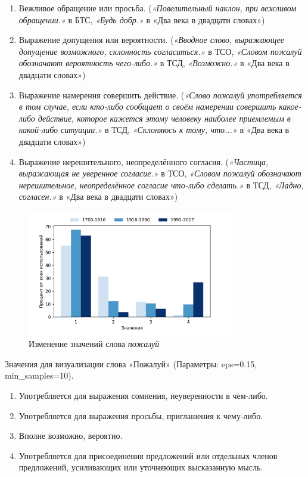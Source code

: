 \begin{enumerate}
    \item Вежливое обращение или просьба.
(\textit{«Повелительный наклон, при вежливом обращении.»} в БТС,
\textit{«Будь добр.»} в «Два века в двадцати словах»)
    \item Выражение допущения или вероятности.
(\textit{«Вводное слово, выражающее допущение возможного, склонность согласиться.»} в ТСО,
\textit{«Словом пожалуй обозначают вероятность чего-либо.»} в ТСД,
\textit{«Возможно.»} в «Два века в двадцати словах»)
    \item Выражение намерения совершить действие.
(\textit{«Слово пожалуй употребляется в том случае, если кто-либо сообщает о своём намерении
совершить какое-либо действие, которое кажется этому человеку наиболее приемлемым в какой-либо ситуации.»} в ТСД,
\textit{«Склоняюсь к тому, что...»} в «Два века в двадцати словах»)
    \item Выражение нерешительного, неопределённого согласия.
(\textit{«Частица, выражающая не уверенное согласие.»} в ТСО,
\textit{«Словом пожалуй обозначают нерешительное, неопределённое согласие что-либо сделать.»} в ТСД,
\textit{«Ладно, согласен.»} в «Два века в двадцати словах»)
\end{enumerate}

\begin{figure}[H]
	\centering
	\includegraphics[width=0.8\textwidth]{img/visualizations/pozhaluj_minimal}
	\caption{Изменение значений слова \textit{пожалуй}}
	\label{fig:Пожалуй}
\end{figure}

Значения для визуализации слова «Пожалуй» (Параметры: eps=0.15, min\_samples=10).

\begin{enumerate}
    \item Употребляется для выражения сомнения, неуверенности в чем-либо.
    \item Употребляется для выражения просьбы, приглашения к чему-либо.
    \item Вполне возможно, вероятно.
    \item Употребляется для присоединения предложений или отдельных членов предложений,
усиливающих или уточняющих высказанную мысль.
\end{enumerate}

